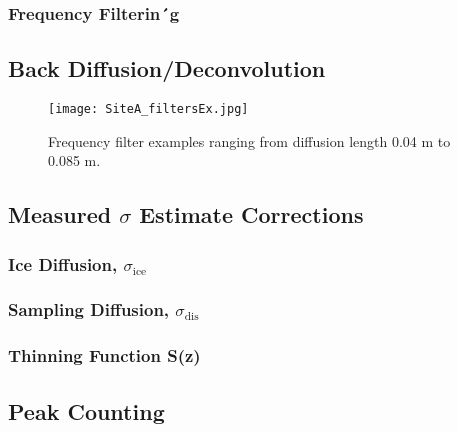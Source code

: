 \documentclass[../../CompleteThesis/Complete_1stDraft.tex]{subfiles}
\begin{document}
\subsubsection[Frequency Filters]{Frequency Filterin´g}
\label{Subsubsec:Method_FirstSigmaEstimate_BackDiffusion_FrequencyFilters}

\subsection[Back Diffusion]{Back Diffusion/Deconvolution}
\label{Subsec:Method_FirstSigmaEstimate_BackDiffusion}
\begin{figure}[h]
	\centering
	\texttt{[image: SiteA\_filtersEx.jpg]}
	\caption[Frequency filters example, Site A]{Frequency filter examples ranging from diffusion length 0.04 m to 0.085 m.}
	\label{fig:SiteA_filtersEx}
\end{figure}

\subsection{Measured $\sigma$ Estimate Corrections}
\label{Subsec:Method_FirstSigmaEstimate_Correction}


\subsubsection[Ice diffusion]{Ice Diffusion, $\sigma_{\text{ice}}$}
\label{Subsubsec:Method_FirstSigmaEstimate_Correction_IceDiffusion}

\subsubsection[Sampling diffusion]{Sampling Diffusion, $\sigma_{\text{dis}}$}
\label{Subsubsec:Method_FirstSigmaEstimate_Correction_SamplingDiffusion}


\subsubsection[Thinning Function]{Thinning Function S(z)}
\label{Subsubsec:Method_FirstSigmaEstimate_Correction_ThinningFunction}






\subsection[Peak Counting]{Peak Counting}
\label{Subsec:Method_FirstSigmaEstimate_PeakCounting}
\end{document}
